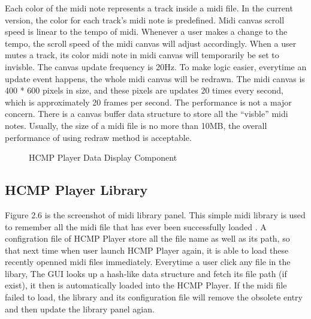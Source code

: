 Each color of the midi note represents a track inside 
a midi file. In the current version, the color for each track's midi note is predefined. 
Midi canvas scroll speed is linear to the tempo of midi. Whenever a user 
makes a change to the tempo, the scroll speed of the midi canvas will adjust
accordingly. When a user mutes a
track, its color midi note in midi canvas will temporarily be set to invisble. 
The canvas
update frequency is 20Hz. To make logic easier, everytime an update event 
happens, the whole midi canvas will be redrawn. The midi canvas is 400 * 600 pixels 
in size, and these pixels are updates 20 times every second, which is approximately 
20 frames per second. The performance is not
a major concern. There is a canvas buffer data 
structure to store all the ``visble'' midi notes. 
Usually, the size of a midi file is no more than 10MB, the overall performance of 
using redraw method is acceptable.

\begin{figure}[H]
\caption{HCMP Player Data Display Component}
\label{fig:speciation}
\end{figure}

\subsection{HCMP Player Library}

Figure 2.6 is the screenshot of midi library panel. This simple midi library is 
used to remember all the midi file that has ever been successfully loaded . 
A configration file of HCMP Player store all the file name as well as its path, 
so that next time when user launch HCMP Player again, it is able to load these 
recently openned midi files immediately. Everytime a user click any file in the libary, 
The GUI looks up a hash-like data structure and fetch its file path (if exist),
it then is automatically
loaded into the HCMP Player. If the midi file failed to load, the library and its
configuration file will remove the obsolete entry and then update the library panel
agian.

